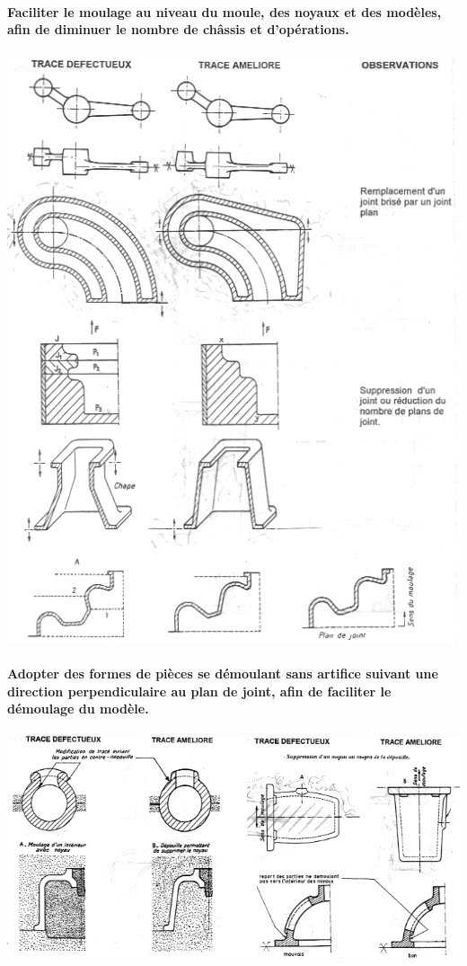 \documentclass[11pt,oneside]{article}
\begin{document}
\paragraph*{Faciliter le moulage au niveau du moule, des noyaux et des modèles,
afin de diminuer le nombre de châssis et d'opérations.} 
\begin{center}
 \includegraphics[width=.8\textwidth]{png/regles_plan}
\end{center}

\paragraph*{Adopter des formes de pièces se démoulant sans artifice suivant une
direction perpendiculaire au plan de joint, afin de faciliter le démoulage du
modèle.}
\begin{center}
 \includegraphics[width=.9\textwidth]{png/regles_depouilles}
\end{center}
\end{document}
